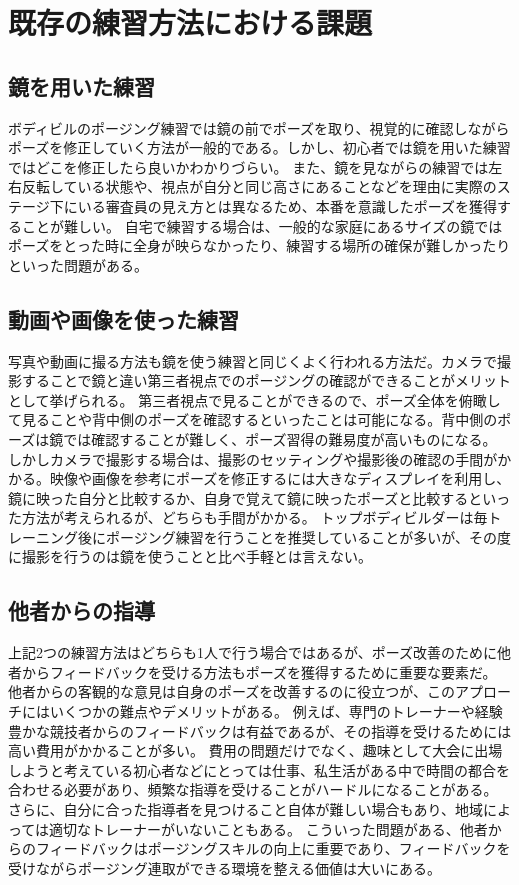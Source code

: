\section{既存の練習方法における課題}
\subsection{鏡を用いた練習}
ボディビルのポージング練習では鏡の前でポーズを取り、視覚的に確認しながらポーズを修正していく方法が一般的である。しかし、初心者では鏡を用いた練習ではどこを修正したら良いかわかりづらい。
また、鏡を見ながらの練習では左右反転している状態や、視点が自分と同じ高さにあることなどを理由に実際のステージ下にいる審査員の見え方とは異なるため、本番を意識したポーズを獲得することが難しい。
自宅で練習する場合は、一般的な家庭にあるサイズの鏡ではポーズをとった時に全身が映らなかったり、練習する場所の確保が難しかったりといった問題がある。
\subsection{動画や画像を使った練習}
写真や動画に撮る方法も鏡を使う練習と同じくよく行われる方法だ。カメラで撮影することで鏡と違い第三者視点でのポージングの確認ができることがメリットとして挙げられる。
第三者視点で見ることができるので、ポーズ全体を俯瞰して見ることや背中側のポーズを確認するといったことは可能になる。背中側のポーズは鏡では確認することが難しく、ポーズ習得の難易度が高いものになる。
しかしカメラで撮影する場合は、撮影のセッティングや撮影後の確認の手間がかかる。映像や画像を参考にポーズを修正するには大きなディスプレイを利用し、鏡に映った自分と比較するか、自身で覚えて鏡に映ったポーズと比較するといった方法が考えられるが、どちらも手間がかかる。
トップボディビルダーは毎トレーニング後にポージング練習を行うことを推奨していることが多いが、その度に撮影を行うのは鏡を使うことと比べ手軽とは言えない。
\subsection{他者からの指導}
上記2つの練習方法はどちらも1人で行う場合ではあるが、ポーズ改善のために他者からフィードバックを受ける方法もポーズを獲得するために重要な要素だ。
他者からの客観的な意見は自身のポーズを改善するのに役立つが、このアプローチにはいくつかの難点やデメリットがある。
例えば、専門のトレーナーや経験豊かな競技者からのフィードバックは有益であるが、その指導を受けるためには高い費用がかかることが多い。
費用の問題だけでなく、趣味として大会に出場しようと考えている初心者などにとっては仕事、私生活がある中で時間の都合を合わせる必要があり、頻繁な指導を受けることがハードルになることがある。
さらに、自分に合った指導者を見つけること自体が難しい場合もあり、地域によっては適切なトレーナーがいないこともある。
こういった問題がある、他者からのフィードバックはポージングスキルの向上に重要であり、フィードバックを受けながらポージング連取ができる環境を整える価値は大いにある。

